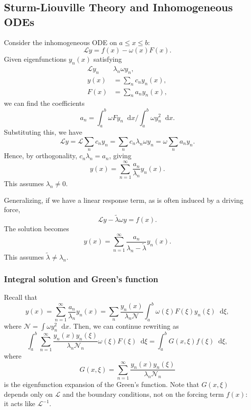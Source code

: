 \documentclass[12pt]{article}
\newcommand{\diff}{\mathop{}\!\mathrm{d}}
\theoremstyle{definition}
\theoremstyle{remark}
\begin{document}
\subsection{Sturm-Liouville Theory and Inhomogeneous ODEs}%
\label{sub:sturm_liouville_theory_and_inhomogeneous_odes}

Consider the inhomogeneous ODE on $a \leq x \leq b$:
\[
	\mathcal{L}y = f(x) - \omega(x) F(x)
.\]
Given eigenfunctions $y_n(x)$ satisfying
\begin{align*}
	\mathcal{L}y_n & \lambda_n \omega y_n, \\
	y(x) &= \sum_{n} c_n y_n(x), \\
	F(x) &= \sum_{n}a_n y_n(x),
\end{align*}
we can find the coefficients
\[
a_n = \int_{a}^{b} \omega F y_n \diff x / \int_{a}^{b} \omega y_n^2\diff x
.\]
Substituting this, we have
\[
\mathcal{L}y = \mathcal{L}\sum_{n}c_n y_n = \sum_{n} c_n \lambda_n \omega y_n = \omega \sum_{n} a_n y_n
.\]
Hence, by orthogonality, $c_n \lambda_n = a_n$, giving
\[
	y(x) = \sum_{n = 1}^{\infty} \frac{a_n}{\lambda_n} y_n(x)
.\]
This assumes $\lambda_n \neq 0$.

Generalizing, if we have a linear response term, as is often induced by a driving force,
\[
	\mathcal{L}y - \tilde \lambda \omega y = f(x)
.\]
The solution becomes
\[
	y(x) = \sum_{n = 1}^{\infty} \frac{a_n}{\lambda_n - \tilde \lambda} y_n(x)
.\]
This assumes $\tilde \lambda \neq \lambda_n$.

\subsubsection{Integral solution and Green's function}%
\label{subsub:integral_solution_and_green_s_function}

Recall that
\[
	y(x) = \sum_{n = 1}^{\infty}\frac{a_n}{\lambda_n} y_n(x) = \sum_{n} \frac{y_n(x)}{\lambda_n \mathcal{N}} \int_{a}^{b} \omega(\xi) F(\xi) y_n(\xi)\diff \xi
,\]
where $\mathcal{N} = \int \omega y_n^2 \diff x$. Then, we can continue rewriting as
\[
	\int_{a}^{b} \sum_{n = 1}^{\infty} \frac{y_n(x) y_n(\xi)}{\lambda_n \mathcal{N}_n} \omega(\xi) F(\xi)\diff \xi = \int_{a}^{b}G(x, \xi) f(\xi)\diff \xi
,\]
where
\[
	G(x, \xi) = \sum_{n = 1}^{\infty} \frac{y_n(x) y_n(\xi)}{\lambda_n \mathcal{N}_n}
\]
is the eigenfunction expansion of the Green's function. Note that $G(x, \xi)$ depends only on $\mathcal{L}$ and the boundary conditions, not on the forcing term $f(x)$: it acts like $\mathcal{L}^{-1}$.
\end{document}
